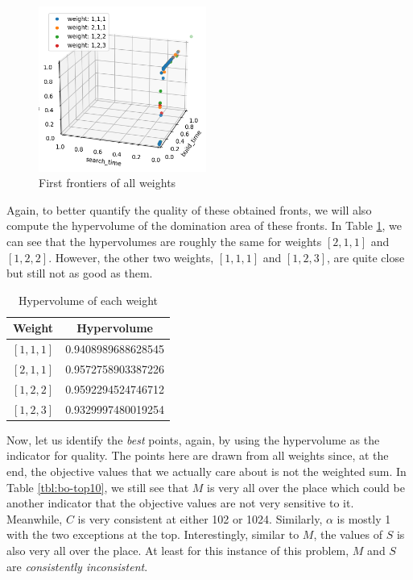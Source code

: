 \begin{figure}[ht]
    \centering
    \includegraphics[width=0.49\textwidth]{../images/report/bo-frontiers-tgt.png}
    \caption{First frontiers of all weights}
    \label{fig:bo-all-frontiers}
\end{figure}

Again, to better quantify the quality of these obtained fronts, we will also compute the hypervolume of the domination area of these fronts. In Table \ref{tbl:hv-bo-all}, we can see that the hypervolumes are roughly the same for weights \([2, 1, 1]\) and \([1, 2, 2]\). However, the other two weights, \([1, 1, 1]\) and \([1, 2, 3]\), are quite close but still not as good as them.

\begin{table}[ht]
    \centering
    \caption{Hypervolume of each weight}
    \label{tbl:hv-bo-all}
    \begin{tabular}{cc}
        \toprule
        Weight & Hypervolume \\
        \midrule
        \([1, 1, 1]\) & 0.9408989688628545 \\
        \([2, 1, 1]\) & 0.9572758903387226 \\
        \([1, 2, 2]\) & 0.9592294524746712 \\
        \([1, 2, 3]\) & 0.9329997480019254 \\
        \bottomrule
    \end{tabular}
\end{table}

Now, let us identify the \textit{best} points, again, by using the hypervolume as the indicator for quality. The points here are drawn from all weights since, at the end, the objective values that we actually care about is not the weighted sum. In Table \ref{tbl:bo-top10}, we still see that \(M\) is very all over the place which could be another indicator that the objective values are not very sensitive to it. Meanwhile, \(C\) is very consistent at either 102 or 1024. Similarly, \(\alpha\) is mostly 1 with the two exceptions at the top. Interestingly, similar to \(M\), the values of \(S\) is also very all over the place. At least for this instance of this problem, \(M\) and \(S\) are \textit{consistently inconsistent}.

